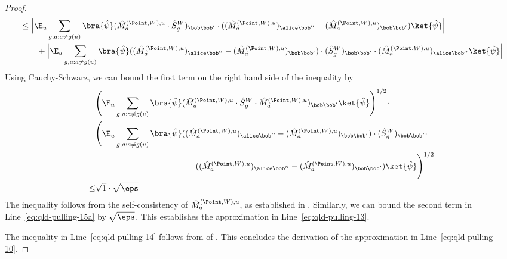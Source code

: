 \begin{proof}
\begin{align}
	&\leq \Big | \E_u \sum_{g,a: a \neq g(u)} \bra{\hat{\psi}} (\hat{M}^{(\Point,W),u}_{a} \cdot \hat{S}^W_{g})_{\bob \bob'} \cdot ((\hat{M}^{(\Point,W),u}_{a})_{\alice \bob''} - (\hat{M}^{(\Point,W),u}_{a})_{\bob \bob'}) \ket{\hat{\psi}} \Big | \label{eq:qld-pulling-15} \\
	& \qquad + \Big | \E_u \sum_{g,a: a \neq g(u)} \bra{\hat{\psi}} ((\hat{M}^{(\Point,W),u}_{a})_{\alice \bob''} - (\hat{M}^{(\Point,W),u}_{a})_{\bob \bob'}) \cdot (\hat{S}^W_{g})_{\bob \bob'} \cdot (\hat{M}^{(\Point,W),u}_{a})_{\alice \bob''} \ket{\hat{\psi}} \Big | \label{eq:qld-pulling-15a}
\end{align}
Using Cauchy-Schwarz, we can bound the first term on the right hand side of the inequality by
\begin{align}
	&\Biggl( \E_u \sum_{g,a: a \neq g(u)} \bra{\hat{\psi}} (\hat{M}^{(\Point,W),u}_{a} \cdot \hat{S}^W_{g} \cdot \hat{M}^{(\Point,W),u}_{a})_{\bob \bob'} \ket{\hat{\psi}}  \Biggr)^{1/2} \cdot \notag \\
	&\Biggl( \E_u \sum_{g,a: a \neq g(u)} \bra{\hat{\psi}} ((\hat{M}^{(\Point,W),u}_{a})_{\alice \bob''} - (\hat{M}^{(\Point,W),u}_{a})_{\bob \bob'}) \cdot (\hat{S}^W_{g})_{\bob \bob'} \cdot \notag\\
  & \hspace{12em}((\hat{M}^{(\Point,W),u}_{a})_{\alice \bob''} - (\hat{M}^{(\Point,W),u}_{a})_{\bob \bob'})  \ket{\hat{\psi}}  \Biggr)^{1/2} \notag \\
	\leq & \sqrt{1} \cdot \sqrt{\eps} \notag
\end{align}
The inequality follows from the self-consistency of $\hat{M}^{(\Point,W),u}_{a}$, as established in . Similarly, we can bound the second term in Line~\eqref{eq:qld-pulling-15a} by $\sqrt{\eps}$.
This establishes the approximation in Line~\eqref{eq:qld-pulling-13}. 

The inequality in Line~\eqref{eq:qld-pulling-14} follows from  of . This concludes the derivation of the approximation in Line~\eqref{eq:qld-pulling-10}.


\end{proof}
